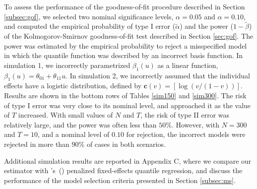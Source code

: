\documentclass[12pt]{article}
\newcommand\cites[1]{\citeauthor{#1}'s\ (\citeyear{#1})}
\def\cvec{\bm{c}}
\begin{document}
To assess the performance of the goodness-of-fit procedure described in Section \ref{subsec:gof}, we selected two
nominal significance levels, $\alpha = 0.05$ and $\alpha = 0.10$, and computed the empirical probability
of type I error ($\tilde{\alpha}$) and the power ($1 - \tilde{\beta}$) of the Kolmogorov-Smirnov goodness-of-fit test described in Section \ref{sec:gof}.
The power was estimated by the empirical probability to reject a misspecified model in which the quantile function
was described by an incorrect basis function. In simulation 1, we incorrectly parametrized
$\beta_1(u)$ as a linear function, $\beta_1(u) = \theta_{01} + \theta_{11}u$. In simulation 2, we incorrectly assumed that the individual effects have
a logistic distribution, defined by $\cvec(v) = \left[\log(v/(1 - v))\right]$. Results are shown in the bottom rows of Tables \ref{sim150} and \ref{sim300}.
The risk of type I error was very close to its nominal level, and approached it as the value of $T$ increased. With small values of $N$ and $T$,
the risk of type II error was relatively large, and the power was often less than $50\%$.
However, with $N = 300$ and $T = 10$, and a nominal level of $0.10$ for rejection, the incorrect models were rejected in more than $90\%$ of cases in both scenarios. 

Additional simulation results are reported in Appendix C, where we compare our estimator with \cites{koenker2004}
penalized fixed-effects quantile regression, and discuss the performance of the model selection criteria
presented in Section \ref{subsec:ms}.




\end{document}
